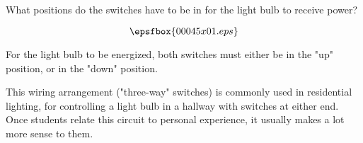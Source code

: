

What positions do the switches have to be in for the light bulb to receive power?

$$\epsfbox{00045x01.eps}$$







For the light bulb to be energized, both switches must either be in the "up" position, or in the "down" position.







This wiring arrangement ("three-way" switches) is commonly used in residential lighting, for controlling a light bulb in a hallway with switches at either end.  Once students relate this circuit to personal experience, it usually makes a lot more sense to them.




